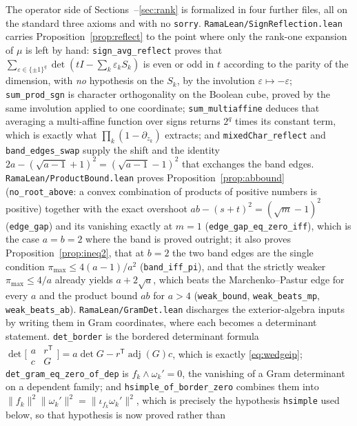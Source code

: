 \documentclass[11pt]{article}
\theoremstyle{remark}
\begin{document}
The operator side of Sections~\cite{PartI}--\ref{sec:rank} is formalized in four
further files, all on the standard three axioms and with no \texttt{sorry}.
\texttt{RamaLean/SignReflection.lean} carries
Proposition~\ref{prop:reflect} to the point where only the rank-one expansion of
$\mu$ is left by hand: \texttt{sign\_avg\_reflect} proves that
$\sum_{\varepsilon\in\{\pm1\}^q}\det(tI-\sum_k\varepsilon_kS_k)$ is even or odd in
$t$ according to the parity of the dimension, with \emph{no} hypothesis on the
$S_k$, by the involution $\varepsilon\mapsto-\varepsilon$; \texttt{sum\_prod\_sgn}
is character orthogonality on the Boolean cube, proved by the same involution
applied to one coordinate; \texttt{sum\_multiaffine} deduces that averaging a
multi-affine function over signs returns $2^q$ times its constant term, which is
exactly what $\prod_k(1-\partial_{z_k})$ extracts; and
\texttt{mixedChar\_reflect} and \texttt{band\_edges\_swap} supply the shift and the
identity $2a-(\sqrt{a-1}+1)^2=(\sqrt{a-1}-1)^2$ that exchanges the band edges.
\texttt{RamaLean/ProductBound.lean} proves Proposition~\ref{prop:abbound}
(\texttt{no\_root\_above}: a convex combination of products of positive numbers is
positive) together with the exact overshoot $ab-(s+t)^2=(\sqrt m-1)^2$
(\texttt{edge\_gap}) and its vanishing exactly at $m=1$
(\texttt{edge\_gap\_eq\_zero\_iff}), which is the case $a=b=2$ where the band is
proved outright; it also proves Proposition~\ref{prop:ineq2}, that at $b=2$ the two
band edges are the single condition $\pi_{\max}\le4(a-1)/a^2$
(\texttt{band\_iff\_pi}), and that the strictly weaker $\pi_{\max}\le4/a$ already
yields $a+2\sqrt a$, which beats the Marchenko--Pastur edge for every $a$ and the
product bound $ab$ for $a>4$ (\texttt{weak\_bound}, \texttt{weak\_beats\_mp},
\texttt{weak\_beats\_ab}). \texttt{RamaLean/GramDet.lean} discharges the exterior-algebra inputs by writing them in
Gram coordinates, where each becomes a determinant statement. \texttt{det\_border} is the
bordered determinant formula
$\det\bigl[\begin{smallmatrix}a&r^{\mathsf T}\\ c&G\end{smallmatrix}\bigr]
=a\det G-r^{\mathsf T}\operatorname{adj}(G)c$, which is exactly \eqref{eq:wedgeip};
\texttt{det\_gram\_eq\_zero\_of\_dep} is $f_k\wedge\omega_k'=0$, the vanishing of a Gram
determinant on a dependent family; and \texttt{hsimple\_of\_border\_zero} combines them
into $\|f_k\|^2\|\omega_k'\|^2=\|\iota_{f_k}\omega_k'\|^2$, which is precisely the
hypothesis \texttt{hsimple} used below, so that hypothesis is now proved rather than
\end{document}
